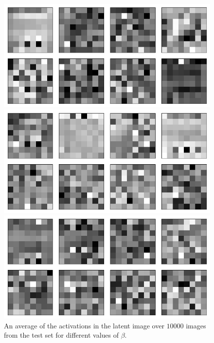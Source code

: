 \begin{figure}[h!]
\centering
\captionsetup{justification=centering}

    \includegraphics[scale=0.3]{figures/results/indiscriminate_decoupling/beta_1_average_activation.png}
    \caption{$\beta=1$}
    \includegraphics[scale=0.3]{figures/results/indiscriminate_decoupling/beta_2_average_activation.png}
    \caption{$\beta=2$}
    \includegraphics[scale=0.3]{figures/results/indiscriminate_decoupling/beta_4_average_activation.png}
    \caption{$\beta=4$}

\caption{An average of the activations in the latent image over $10000$ images from the test set for different values of $\beta$.}
\label{fig:latent_image_originals_posterior_samples}
\end{figure}





